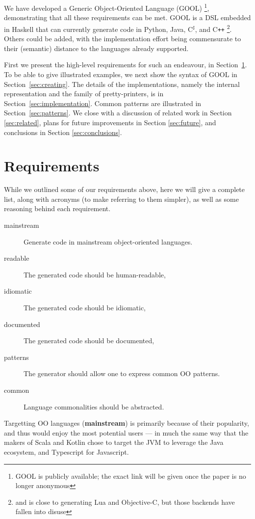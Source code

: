 \documentclass[sigplan,review,anonymous,prologue,dvipsnames]{acmart}
\newcommand{\Csharp}{C$^{\sharp}$}
\newcommand{\Cplusplus}{C\texttt{++}}
\newcommand{\abbrev}[1]{\textbf{#1}}
\newcommand{\mainstream}{\abbrev{mainstream}}
\begin{document}
We have developed a Generic Object-Oriented Language (GOOL)%
\footnote{GOOL is publicly available; the exact link will be
given once the paper is no longer anonymous}, demonstrating
that all these requirements can be met.  GOOL is a DSL embedded in Haskell that
can currently generate code in Python, Java, \Csharp, and \Cplusplus%
\footnote{and is close to generating Lua and Objective-C, but those backends
have fallen into disuse}. Others could be added, with the implementation
effort being commensurate to their (semantic) distance to the languages
already supported.

First we present the high-level requirements for such an endeavour, in
Section~\ref{sec:req}.  To be able to give illustrated examples, we
next show the syntax of GOOL in Section~\ref{sec:creating}. The details of
the implementations, namely the internal representation and the
family of pretty-printers, is in Section~\ref{sec:implementation}.
Common patterns are illustrated in Section~\ref{sec:patterns}.  We
close with a discussion of related work in Section \ref{sec:related}, plans for
future improvements in Section \ref{sec:future}, and conclusions in Section
\ref{sec:conclusions}.

\section{Requirements} \label{sec:req}

While we outlined some of our requirements above, here we will give a
complete list, along with acronyms (to make referring to them simpler),
as well as some reasoning behind each requirement.

\begin{description}
\item[mainstream] Generate code in mainstream object-oriented languages.
\item[readable] The generated code should be human-readable,
\item[idiomatic] The generated code should be idiomatic,
\item[documented] The generated code should be documented,
\item[patterns] The generator should allow one to express common OO patterns.
\item[common] Language commonalities should be abstracted.
\end{description}

Targetting OO languages (\mainstream) is primarily because of their popularity, and thus
would enjoy the most potential users --- in much the same way that the makers
of Scala and Kotlin chose to target the JVM to leverage the Java ecosystem, and
Typescript for Javascript.
\end{document}
